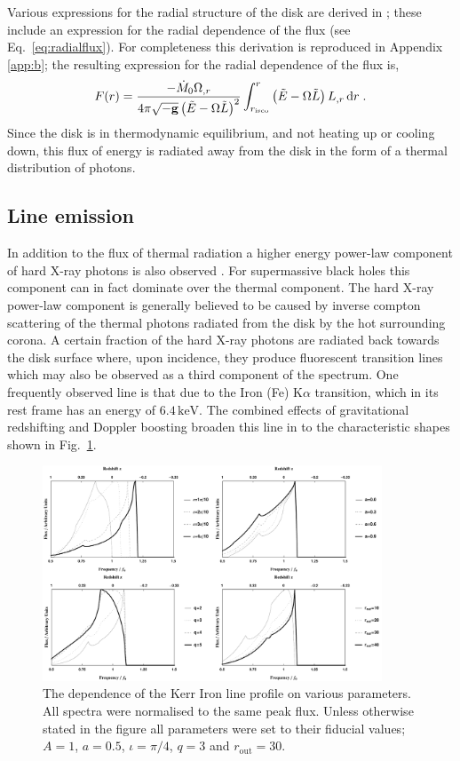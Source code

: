 Various expressions for the radial structure of the disk are derived in \cite{1974ApJ...191..499P}; these include an expression for the radial dependence of the flux (see Eq.\ \ref{eq:radialflux}). For completeness this derivation is reproduced in Appendix \ref{app:b}; the resulting expression for the radial dependence of the flux is,
\begin{equation}\label{eq:radialfluxmain} F(r)=\frac{-\dot{M}_{0}\Omega_{,r}}{4\pi \sqrt{-{\bf{g}}}\left( \tilde{E}-\Omega \tilde{L} \right)^{2}} \int_{r_{\textrm{isco}}}^{r}\left(\tilde{E}-\Omega \tilde{L}\right) L_{,r}\, \textrm{d}r \; .\end{equation}
Since the disk is in thermodynamic equilibrium, and not heating up or cooling down, this flux of energy is radiated away from the disk in the form of a thermal distribution of photons.

\subsection{Line emission}\label{subsec:line}
In addition to the flux of thermal radiation a higher energy power-law component of hard X-ray photons is also observed \citep{1994MNRAS.269L..55Z}. For supermassive black holes this component can in fact dominate over the thermal component. The hard X-ray power-law component is generally believed to be caused by inverse compton scattering of the thermal photons radiated from the disk by the hot surrounding corona. A certain fraction of the hard X-ray photons are radiated back towards the disk surface where, upon incidence, they produce fluorescent transition lines which may also be observed as a third component of the spectrum. One frequently observed line is that due to the Iron (Fe) K$\alpha$ transition, which in its rest frame has an energy of $6.4\,\textrm{keV}$. The combined effects of gravitational redshifting and Doppler boosting broaden this line in to the characteristic shapes shown in Fig.\ \ref{fig:KerrLine}.

\begin{figure}[t]
 \centering
 \includegraphics[trim=0cm 0cm 0cm 0cm, width=0.9\textwidth]{KerrLines.pdf}
 \caption{The dependence of the Kerr Iron line profile on various parameters. All spectra were normalised to the same peak flux. Unless otherwise stated in the figure all parameters were set to their fiducial values; $A=1$, $a=0.5$, $\iota=\pi/4$, $q=3$ and $r_{\textrm{out}}=30$.}
 \label{fig:KerrLine}
\end{figure}

